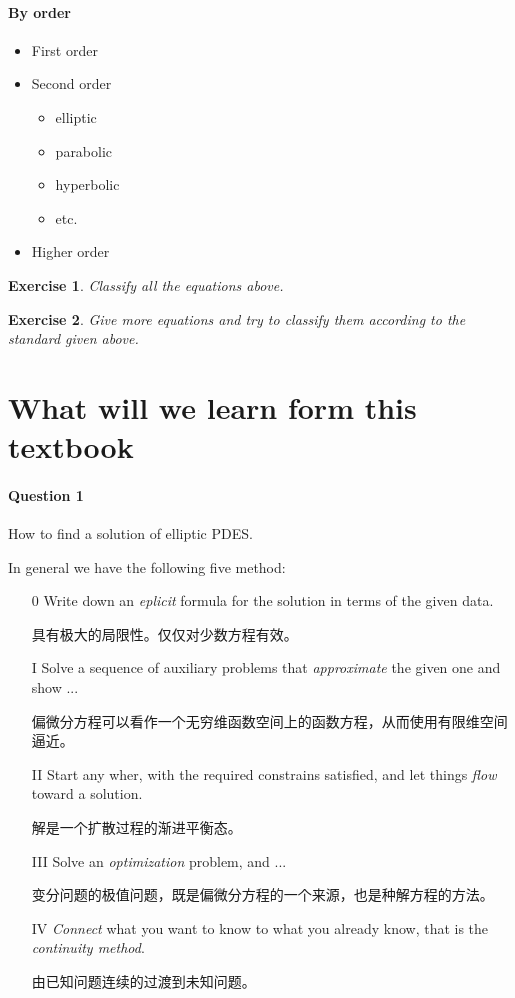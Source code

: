 \documentclass{simplenotes}
\newtheorem{exercise}{Exercise}
\begin{document}
\paragraph{By order}
\begin{itemize}[nosep]
\item First order
\item Second order
\begin{itemize}[nosep]
\item
elliptic
\item
parabolic
\item
hyperbolic
\item
etc.
\end{itemize}
\item Higher order
\end{itemize}

\begin{exercise}
Classify all the equations above.
\end{exercise}

\begin{exercise}
Give more equations and try to classify them according to the standard given above.
\end{exercise}

\section{What will we learn form this textbook}

\paragraph{Question 1}
How to find a solution of elliptic PDES.

In general we have the following five method:
\begin{itemize}
\item[0] Write down an \emph{eplicit} formula for the solution in terms of the given data.

具有极大的局限性。仅仅对少数方程有效。
\item[I] Solve a sequence of auxiliary problems that \emph{approximate} the given one and show ...

偏微分方程可以看作一个无穷维函数空间上的函数方程，从而使用有限维空间逼近。

\item[II] Start any wher, with the required constrains satisfied, and let things \emph{flow} toward a solution.

解是一个扩散过程的渐进平衡态。

\item[III] Solve an \emph{optimization} problem, and ...

变分问题的极值问题，既是偏微分方程的一个来源，也是种解方程的方法。

\item[IV] \emph{Connect} what you want to know to what you already know, that is the \emph{continuity method}.

由已知问题连续的过渡到未知问题。
\end{itemize}
\end{document}

